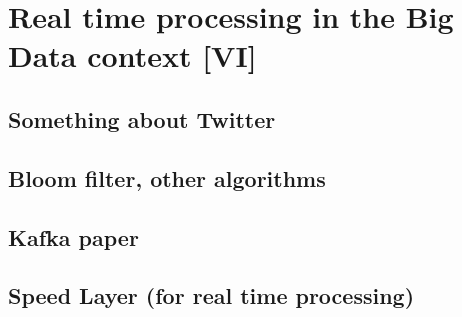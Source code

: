 \chapter{Real time processing in the Big Data context [VI]}
\label{chap:real_time_processing}

\section{Something about Twitter}

\section{Bloom filter, other algorithms}

\section{Kafka paper}

\section{Speed Layer (for real time processing)}